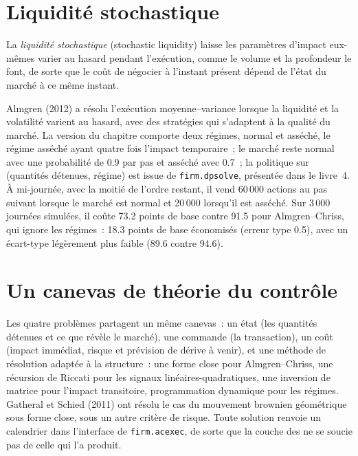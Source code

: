 \section{Liquidité stochastique}

\begin{definition}\label{def:mx:beyond-almgren-chriss:stochliq}
La \emph{liquidité stochastique} (stochastic liquidity) laisse les paramètres d'impact eux-mêmes varier au hasard pendant l'exécution, comme le volume et
la profondeur le font, de sorte que le coût de négocier à l'instant présent dépend de l'état du marché à ce même instant.
\end{definition}

Almgren (2012) a résolu l'exécution moyenne--variance lorsque la liquidité et la volatilité varient au hasard, avec des stratégies qui s'adaptent à la qualité du marché. La
version du chapitre comporte deux régimes, normal et asséché, le régime asséché ayant quatre fois l'impact temporaire~; le marché reste normal avec une probabilité de 0.9 par
pas et asséché avec 0.7~; la politique sur (quantités détenues, régime) est issue de \texttt{firm.dpsolve}, présentée dans le livre~4. À mi-journée, avec la moitié de l'ordre restant, il
vend 60\,000 actions au pas suivant lorsque le marché est normal et 20\,000 lorsqu'il est asséché. Sur 3\,000 journées simulées, il coûte 73.2 points de base contre
91.5 pour Almgren--Chriss, qui ignore les régimes~: 18.3 points de base économisés (erreur type 0.5), avec un écart-type légèrement plus faible (89.6 contre 94.6).

\section{Un canevas de théorie du contrôle}

Les quatre problèmes partagent un même canevas~: un état (les quantités détenues et ce que révèle le marché), une commande (la transaction), un coût (impact immédiat, risque et prévision
de dérive à venir), et une méthode de résolution adaptée à la structure~: une forme close pour Almgren--Chriss, une récursion de Riccati pour les signaux linéaires-quadratiques, une
inversion de matrice pour l'impact transitoire, programmation dynamique pour les régimes. Gatheral et Schied (2011) ont résolu le cas du mouvement brownien géométrique sous forme close, sous
un autre critère de risque. Toute solution renvoie un calendrier dans l'interface de \texttt{firm.acexec}, de sorte que la couche des  ne se soucie pas de celle qui l'a produit.


